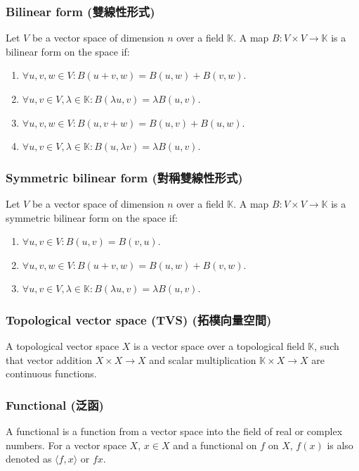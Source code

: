 \documentclass[a4paper,12pt]{report}
\begin{document}
\subsubsection{Bilinear form (雙線性形式)}
Let $V$ be a vector space of dimension $n$ over a field $\mathbb{K}$. A map $B\colon V\times V\rightarrow \mathbb{K}$ is a bilinear form on the space if:
\begin{enumerate}
\item $\forall u,v,w\in V\colon B(u+v,w)=B(u,w)+B(v,w)$.
\item $\forall u,v\in V,\lambda\in \mathbb{K}\colon B(\lambda u,v)=\lambda B(u,v)$.
\item $\forall u,v,w\in V\colon B(u,v+w)=B(u,v)+B(u,w)$.
\item $\forall u,v\in V,\lambda\in \mathbb{K}\colon B(u,\lambda v)=\lambda B(u,v)$.
\end{enumerate}
\subsubsection{Symmetric bilinear form (對稱雙線性形式)}
Let $V$ be a vector space of dimension $n$ over a field $\mathbb{K}$. A map $B\colon V\times V\rightarrow \mathbb{K}$ is a symmetric bilinear form on the space if:
\begin{enumerate}
\item $\forall u,v\in V\colon B(u,v)=B(v,u)$.
\item $\forall u,v,w\in V\colon B(u+v,w)=B(u,w)+B(v,w)$.
\item $\forall u,v\in V,\lambda\in \mathbb{K}\colon B(\lambda u,v)=\lambda B(u,v)$.
\end{enumerate}
\subsubsection{Topological vector space (TVS) (拓樸向量空間)}
A topological vector space $X$ is a vector space over a topological field $\mathbb{K}$, such that vector addition $X\times X\to X$ and scalar multiplication $\mathbb{K}\times X \to X$ are continuous functions.
\subsubsection{Functional (泛函)}
A functional is a function from a vector space into the field of real or complex numbers. For a vector space $X$, $x\in X$ and a functional on $f$ on $X$, $f(x)$ is also denoted as $\langle f,x\rangle$ or $fx$.
\end{document}
